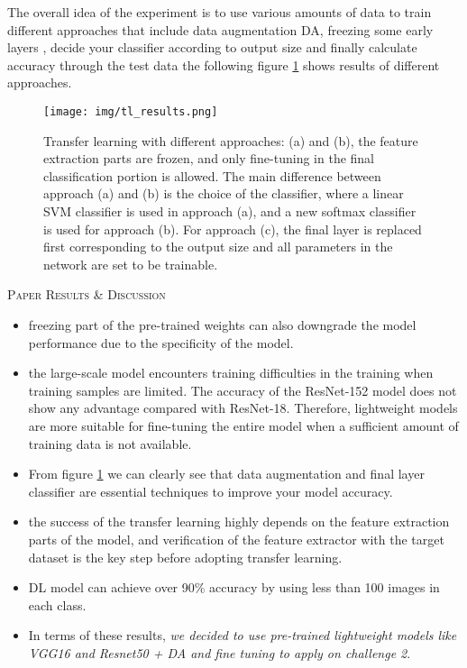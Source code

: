 \documentclass[10pt,twocolumn,letterpaper]{article}
\begin{document}
The overall idea of the experiment is to use various amounts of data to train different approaches that include data augmentation DA, freezing some early layers , decide your classifier according to output size and finally calculate accuracy through the test data the following figure \ref{figure:tl_results} shows results of different approaches.
\begin{figure}[h]
\centering
\texttt{[image: img/tl\_results.png]}
\caption{ Transfer learning with different approaches: (a) and (b), the feature extraction parts are frozen, and only fine-tuning in the final classification portion is allowed. The main difference between approach (a) and (b) is the choice of the classifier, where a linear SVM classifier is used in approach (a), and a new softmax classifier is used for approach (b). For approach (c), the final layer is replaced first corresponding to the output size and all parameters in the network are set to be
trainable. \cite{transfer-learning} \label{figure:tl_results}
}
\end{figure}
\newline
\textsc{Paper Results & Discussion}
\begin{itemize}
    \item freezing part of the pre-trained weights can also downgrade the model performance due to the specificity of the model.
    \item the large-scale model encounters training difficulties in the training when training samples are limited. The accuracy of the ResNet-152 model does not show any advantage compared with ResNet-18. Therefore, lightweight models are more suitable for fine-tuning the entire model when a sufficient amount of training data is not available.
    \item From figure \ref{figure:tl_results} we can clearly see that data augmentation and final layer classifier are essential techniques to improve your model accuracy. 
    \item the success of the transfer learning highly depends on the feature extraction parts of the model, and verification of the feature extractor with the target dataset is the key step before adopting transfer learning.
    \item DL model can achieve over 90\% accuracy by using less than 100 images in each class.
    \item In terms of these results, \textit{we decided to use pre-trained lightweight models like VGG16 and Resnet50 + DA and fine tuning to apply on challenge 2}.
\end{itemize}
\end{document}
